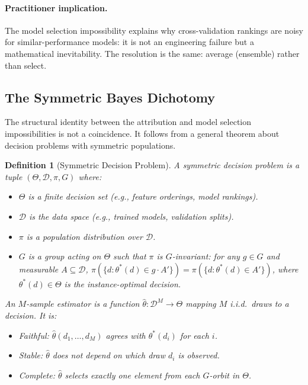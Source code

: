 \documentclass{article}
\newtheorem{definition}[theorem]{Definition}
\begin{document}
\paragraph{Practitioner implication.}
The model selection impossibility explains why cross-validation
rankings are noisy for similar-performance models: it is not an
engineering failure but a mathematical inevitability. The resolution
is the same: average (ensemble) rather than select.

\subsection{The Symmetric Bayes Dichotomy}

The structural identity between the attribution and model selection
impossibilities is not a coincidence. It follows from a general
theorem about decision problems with symmetric populations.

\begin{definition}[Symmetric Decision Problem]
\label{def:symmetric-decision}
A \emph{symmetric decision problem} is a tuple
$(\Theta, \mathcal{D}, \pi, G)$ where:
\begin{itemize}
    \item $\Theta$ is a finite \emph{decision set} (e.g., feature
      orderings, model rankings).
    \item $\mathcal{D}$ is the data space (e.g., trained models,
      validation splits).
    \item $\pi$ is a population distribution over $\mathcal{D}$.
    \item $G$ is a group acting on $\Theta$ such that $\pi$ is
      $G$-\emph{invariant}: for any $g \in G$ and measurable
      $A \subseteq \mathcal{D}$,
      $\pi(\{d : \theta^*(d) \in g \cdot A'\}) =
       \pi(\{d : \theta^*(d) \in A'\})$,
      where $\theta^*(d) \in \Theta$ is the instance-optimal decision.
\end{itemize}
An \emph{$M$-sample estimator} is a function
$\hat\theta : \mathcal{D}^M \to \Theta$ mapping $M$ i.i.d.\
draws to a decision. It is:
\begin{itemize}
    \item \emph{Faithful}: $\hat\theta(d_1, \ldots, d_M)$ agrees
      with $\theta^*(d_i)$ for each $i$.
    \item \emph{Stable}: $\hat\theta$ does not depend on which
      draw $d_i$ is observed.
    \item \emph{Complete}: $\hat\theta$ selects exactly one element
      from each $G$-orbit in $\Theta$.
\end{itemize}
\end{definition}
\end{document}
